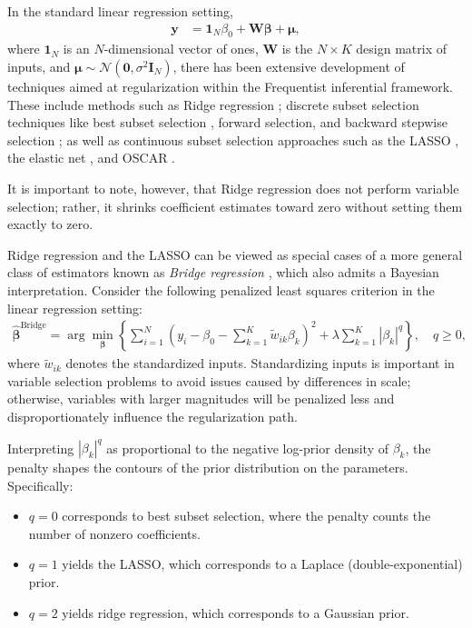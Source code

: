 In the standard linear regression setting,
\begin{align*}
	\mathbf{y} &= \mathbf{1}_N \beta_0 + \mathbf{W}\boldsymbol{\beta} + \boldsymbol{\mu},
\end{align*}
where \(\mathbf{1}_N\) is an \(N\)-dimensional vector of ones, \(\mathbf{W}\) is the \(N \times K\) design matrix of inputs, and \(\boldsymbol{\mu} \sim \mathcal{N}(\mathbf{0}, \sigma^2 \mathbf{I}_N)\), there has been extensive development of techniques aimed at regularization within the Frequentist inferential framework. These include methods such as Ridge regression \cite{hoerl1970ridge}; discrete subset selection techniques like best subset selection \cite{furnival1974regressions}, forward selection, and backward stepwise selection \cite{hastie2009elements}; as well as continuous subset selection approaches such as the LASSO \cite{tibshirani1996regression}, the elastic net \cite{zou2005regularization}, and OSCAR \cite{bondell2008simultaneous}.

It is important to note, however, that Ridge regression does not perform variable selection; rather, it shrinks coefficient estimates toward zero without setting them exactly to zero.

Ridge regression and the LASSO can be viewed as special cases of a more general class of estimators known as \textit{Bridge regression} \cite{fu1998penalized}, which also admits a Bayesian interpretation. Consider the following penalized least squares criterion in the linear regression setting:
\begin{align*}
	\hat{\boldsymbol{\beta}}^{\text{Bridge}} = \arg\min_{\boldsymbol{\beta}} \left\{ \sum_{i=1}^N \left( y_i - \beta_0 - \sum_{k=1}^K \tilde{w}_{ik} \beta_k \right)^2 + \lambda \sum_{k=1}^K |\beta_k|^q \right\}, \quad q \geq 0,
\end{align*}
where \(\tilde{w}_{ik}\) denotes the standardized inputs. Standardizing inputs is important in variable selection problems to avoid issues caused by differences in scale; otherwise, variables with larger magnitudes will be penalized less and disproportionately influence the regularization path.

Interpreting \( |\beta_k|^q \) as proportional to the negative log-prior density of \( \beta_k \), the penalty shapes the contours of the prior distribution on the parameters. Specifically:
\begin{itemize}
	\item \( q = 0 \) corresponds to best subset selection, where the penalty counts the number of nonzero coefficients.
	\item \( q = 1 \) yields the LASSO, which corresponds to a Laplace (double-exponential) prior.
	\item \( q = 2 \) yields ridge regression, which corresponds to a Gaussian prior.  
	 
\end{itemize}

